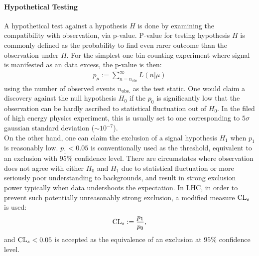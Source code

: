 \paragraph{Hypothetical Testing}
A hypothetical test against a hypothesis $H$ is done by examining the compatibility with observation, via p-value.
P-value for testing hypothesis $H$ is commonly defined as the probability to find even rarer outcome than the observation under $H$. 
For the simplest one bin counting experiment where signal is manifested as an data excess, the p-value is then:
\begin{align}
p_\mu := \sum_{n=n_{\mathrm{obs}}}^{\infty} L(n|\mu)  \label{eq::poisson_pval}
\end{align}
using the number of observed events $n_{\mathrm{obs.}}$ as the test static.
One would claim a discovery against the null hypothesis $H_0$ if the $p_0$ is significantly low that the observation can be hardly ascribed to statistical fluctuation out of $H_0$. In the filed of high energy physics experiment, this is usually set to one corresponding to $5\sigma$ gaussian standard deviation ($\sim 10^{-7}$). \\

On the other hand, one can claim the exclusion of a signal hypothesis $H_1$ when $p_1$ is reasonably low. $p_1<0.05$ is conventionally used as the threshold, equivalent to an exclusion with $95\%$ confidence level. There are circumstates where observation does not agree with either $H_0$ and $H_1$ due to statistical fluctuation or more seriously poor understanding to backgrounds, and result in strong exclusion power typically when data undershoots the expectation. In LHC, in order to prevent such potentially unreasonably strong exclusion, a modified measure $\mathrm{CL}_s$ is used:
\begin{align}
\mathrm{CL}_s := \frac{p_1}{p_0},
\end{align}
and $\mathrm{CL}_s<0.05$ is accepted as the equivalence of an exclusion at $95\%$ confidence level. \\

